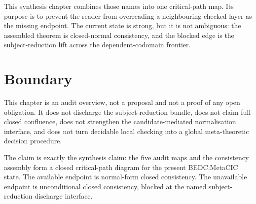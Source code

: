 This synthesis chapter combines those names into one critical-path map. Its
purpose is to prevent the reader from overreading a neighbouring checked layer
as the missing endpoint. The current state is strong, but it is not ambiguous:
the assembled theorem is closed-normal consistency, and the blocked edge is the
subject-reduction lift across the dependent-codomain frontier.

\section{Boundary}
\label{sec:metacic-audit-synthesis-boundary}

This chapter is an audit overview, not a proposal and not a proof of any open
obligation. It does not discharge the subject-reduction bundle, does not claim
full closed confluence, does not strengthen the candidate-mediated
normalisation interface, and does not turn decidable local checking into a
global meta-theoretic decision procedure.

The claim is exactly the synthesis claim: the five audit maps and the
consistency assembly form a closed critical-path diagram for the present
BEDC.MetaCIC state. The available endpoint is normal-form closed consistency.
The unavailable endpoint is unconditional closed consistency, blocked at the
named subject-reduction discharge interface.




